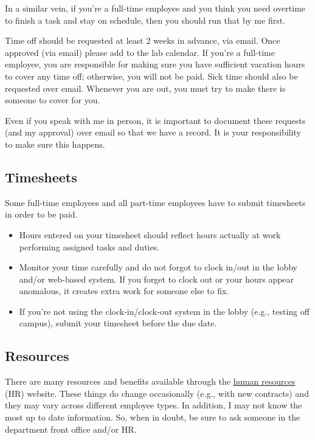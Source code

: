 \documentclass[letterpaper,11pt,oneside]{memoir}
\begin{document}
In a similar vein, if you're a full-time employee and you think you need overtime to finish a task and stay on schedule, then you should run that by me first.

Time off should be requested at least 2 weeks in advance, via email. Once approved (via email) please add to the lab calendar. If you're a full-time employee, you are responsible for making sure you have sufficient vacation hours to cover any time off; otherwise, you will not be paid. Sick time should also be requested over email. Whenever you are out, you must try to make there is someone to cover for you.

\begin{shaded}
\noindent Even if you speak with me in person, it is important to document these requests (and my approval) over email so that we have a record. It is your responsibility to make sure this happens.
\end{shaded}

\subsection{Timesheets}

Some full-time employees and all part-time employees have to submit timesheets in order to be paid. 

\begin{itemize}
\item Hours entered on your timesheet should reflect hours actually at work performing assigned tasks and duties.
\item Monitor your time carefully and do not forgot to clock in/out in the lobby and/or web-based system. If you forget to clock out or your hours appear anomalous, it creates extra work for someone else to fix. 
\item If you're not using the clock-in/clock-out system in the lobby (e.g., testing off campus), submit your timesheet before the due date.
\end{itemize}


\subsection{Resources}

There are many resources and benefits available through the \href{https://www.temple.edu/faculty-and-staff/working-temple/human-resources}{human resources} (HR) website. These things do change occasionally (e.g., with new contracts) and they may vary across different employee types. In addition, I may not know the most up to date information. So, when in doubt, be sure to ask someone in the department front office and/or HR. 
\end{document}
